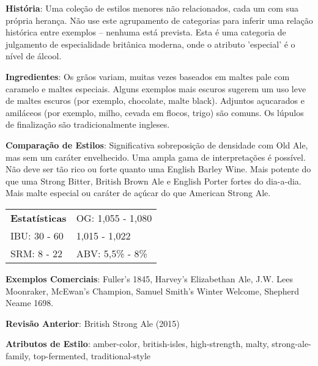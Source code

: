 \textbf{História}: Uma coleção de estilos menores não relacionados, cada um com sua própria herança. Não use este agrupamento de categorias para inferir uma relação histórica entre exemplos – nenhuma está prevista. Esta é uma categoria de julgamento de especialidade britânica moderna, onde o atributo 'especial' é o nível de álcool.

\textbf{Ingredientes}: Os grãos variam, muitas vezes baseados em maltes pale com caramelo e maltes especiais. Alguns exemplos mais escuros sugerem um uso leve de maltes escuros (por exemplo, chocolate, malte black). Adjuntos açucarados e amiláceos (por exemplo, milho, cevada em flocos, trigo) são comuns. Os lúpulos de finalização são tradicionalmente ingleses.

\textbf{Comparação de Estilos}: Significativa sobreposição de densidade com Old Ale, mas sem um caráter envelhecido. Uma ampla gama de interpretações é possível. Não deve ser tão rico ou forte quanto uma English Barley Wine. Mais potente do que uma Strong Bitter, British Brown Ale e English Porter fortes do dia-a-dia. Mais malte especial ou caráter de açúcar do que American Strong Ale.

\begin{tabular}{@{}p{35mm}p{35mm}@{}}
  \textbf{Estatísticas} & OG: 1,055 - 1,080 \\
  IBU: 30 - 60  & 1,015 - 1,022  \\
  SRM: 8 - 22  & ABV: 5,5\% - 8\%
\end{tabular}

\textbf{Exemplos Comerciais}: Fuller’s 1845, Harvey’s Elizabethan Ale, J.W. Lees Moonraker, McEwan’s Champion, Samuel Smith’s Winter Welcome, Shepherd Neame 1698.

\textbf{Revisão Anterior}: British Strong Ale (2015)

\textbf{Atributos de Estilo}: amber-color, british-isles, high-strength, malty, strong-ale-family, top-fermented, traditional-style
